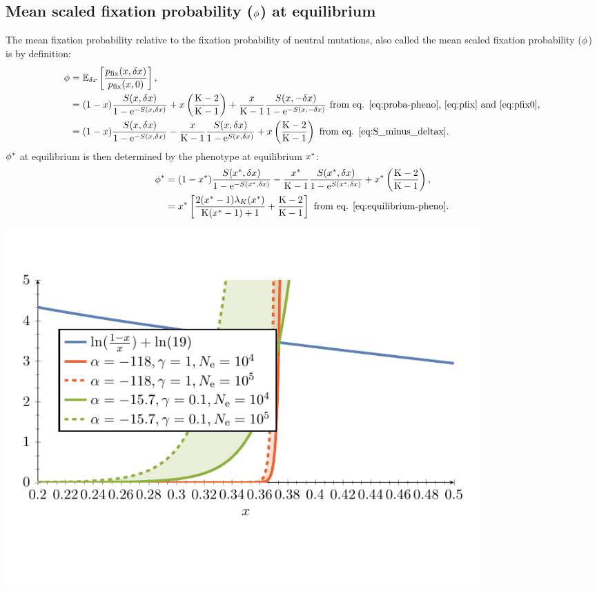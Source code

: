 \subsection{Mean scaled fixation probability (\texorpdfstring{$\phi$}{φ}) at equilibrium}
The mean fixation probability relative to the fixation probability of neutral mutations, also called the mean scaled fixation probability ($\phi$) is by definition:
\begin{align}
\phi & = \operatorname{\mathbb{E}}_{\delta x} \left[ \frac{p_{\text{fix}}(x, \delta x)}{p_{\text{fix}}(x, 0)} \right], \\
 & = (1 - x) \frac{ S(x, \delta x)}{1 - \mathrm{e}^{-S(x, \delta x)}} + x \left(\frac{\text{K} - 2}{\text{K} - 1}\right) + \frac{x}{\text{K}-1} \frac{ S(x, -\delta x)}{1 - \mathrm{e}^{-S(x, -\delta x)}} \text{ from eq. \ref{eq:proba-pheno}, \ref{eq:pfix} and \ref{eq:pfix0}}, \\
 & = (1 - x) \frac{ S(x, \delta x)}{1 - \mathrm{e}^{-S(x, \delta x)}} - \frac{x}{\text{K}-1}  \frac{ S(x, \delta x)}{1 - \mathrm{e}^{S(x, \delta x)}} +  x \left(\frac{\text{K} - 2}{\text{K} - 1}\right) \text{ from eq. \ref{eq:S_minus_deltax}}.
\end{align}
$\phi^{*}$ at equilibrium is then determined by the phenotype at equilibrium $x^{*}$:
\begin{align}
\phi^{*} &= (1 - x^{*}) \frac{ S(x^{*}, \delta x)}{1 - \mathrm{e}^{-S(x^{*}, \delta x)}} - \frac{x^{*}}{\text{K}-1} \frac{ S(x^{*}, \delta x)}{1 - \mathrm{e}^{S(x^{*}, \delta x)}} + x^{*} \left(\frac{\text{K} - 2}{\text{K} - 1}\right) , \\
 &= x^{*} \left[ \frac{2 (x^{*}-1)  \lambda_{K}(x^{*}) }{\text{K} (x^{*}-1)+1} + \frac{\text{K} - 2}{\text{K} - 1}\right] \text{ from eq. \ref{eq:equilibrium-pheno}}.
\end{align}
\begin{center}
 \includegraphics[width=0.8\textwidth, page=2] {analytical-relaxation}
\end{center}
